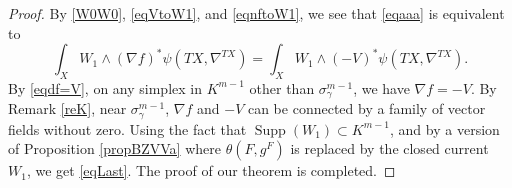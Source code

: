 \documentclass[JEP,XML,SOM,Unicode]{cedram}
\theoremstyle{plain}
\theoremstyle{definition}
\theoremstyle{remark}
\DeclareMathOperator{\Supp}{Supp}
\begin{document}
\begin{proof}
By \eqref{W0W0}, \eqref{eqVtoW1}, and \eqref{eqnftoW1}, we see that \eqref{eqaaa} is equivalent to
\begin{equation}\label{eqLast}
\int_{X}W_{1} \wedge (\nabla
f)^{*}\psi(TX,\nabla^{TX})=\int_{X}W_{1}\wedge
(-V)^{*}\psi(TX,\nabla^{TX}).
\end{equation}
By \eqref{eqdf=V}, on any simplex in
$K^{m-1}$ other than $\sigma_{\gamma}^{m-1}$, we have $\nabla f=-V$.
By Remark \ref{reK}, near $\sigma_{\gamma}^{m-1}$, $\nabla
f$ and $-V$ can be connected by a family of vector fields without
zero. Using the fact that $\Supp(W_{1})\subset K^{m-1}$,
and by a version of Proposition \ref{propBZVVa} where
$\theta(F,g^{F})$ is replaced by the closed current $W_{1}$, we get \eqref{eqLast}.
The proof of our theorem is completed.
\end{proof}

\backmatter


\end{document}
